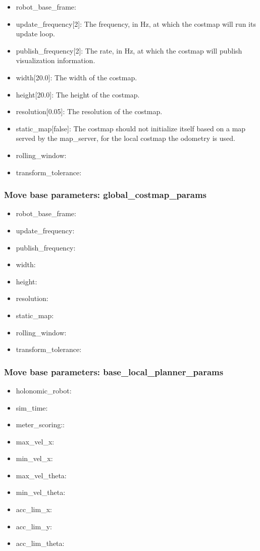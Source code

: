 \documentclass[10pt,journal,compsoc]{IEEEtran}
\begin{document}
\begin{itemize}
\item robot\_base\_frame: 
\item update\_frequency[2]: The frequency, in Hz, at which the costmap will run its update loop. 
\item publish\_frequency[2]: The rate, in Hz, at which the costmap will publish visualization information.
\item width[20.0]: The width of the costmap.
\item height[20.0]: The height of the costmap.
\item resolution[0.05]: The resolution of the costmap.
\item static\_map[false]: The costmap should not initialize itself based on a map served by the map\_server, for the local costmap the odometry is used.
\item rolling\_window:
\item transform\_tolerance:
\end{itemize}

\subsubsection{Move base parameters: global\_costmap\_params}
\begin{itemize}
\item robot\_base\_frame:
\item update\_frequency:
\item publish\_frequency:
\item width:
\item height:
\item resolution:
\item static\_map:
\item rolling\_window:
\item transform\_tolerance:
\end{itemize}

\subsubsection{Move base parameters: base\_local\_planner\_params}
\begin{itemize}
\item holonomic\_robot:
\item sim\_time:
\item meter\_scoring::
\item max\_vel\_x:
\item min\_vel\_x:
\item max\_vel\_theta:
\item min\_vel\_theta:
\item acc\_lim\_x:
\item acc\_lim\_y:
\item acc\_lim\_theta:
\end{itemize}
\end{document}

